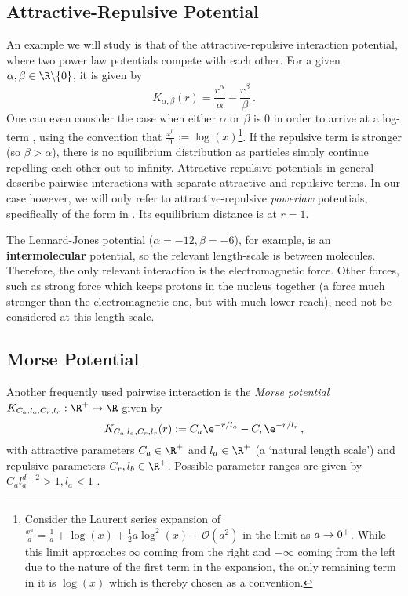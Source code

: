 \subsection{Attractive-Repulsive Potential}
An example we will study is that of the attractive-repulsive interaction potential, where two power law potentials compete with each other.
For a given $\alpha, \beta \in \R \backslash \{0\}$, it is given by
\begin{equation}
  K_{\alpha, \beta}(r) = \frac{r^\alpha}{\alpha} - \frac{r^\beta}{\beta}\,.
  \label{eq:attractive-repulsive-potential}
\end{equation}
One can even consider the case when either $\alpha$ or $\beta$ is 0 in order to arrive at a log-term \parencite{2017-explicit-solutions}, using the convention that $\frac{x^0}{0} := \log(x)$\footnote{
  Consider the Laurent series expansion of $\frac{x^a}{a} = \frac{1}{a} + \log(x) + \frac{1}{2}a \log^2(x) + \mathcal{O}(a^2)$ in the limit as $a \rightarrow 0^+$.
  While this limit approaches $\infty$ coming from the right and $-\infty$ coming from the left due to the nature of the first term in the expansion, the only remaining term in it is $\log(x)$ which is thereby chosen as a convention.
}.
If the repulsive term is stronger (so $\beta > \alpha$), there is no equilibrium distribution as particles simply continue repelling each other out to infinity.
Attractive-repulsive potentials in general describe pairwise interactions with separate attractive and repulsive terms.
In our case however, we will only refer to attractive-repulsive \textit{powerlaw} potentials, specifically of the form in .
Its equilibrium distance is at $r = 1$.

The Lennard-Jones potential ($\alpha=-12, \beta=-6$), for example, is an \textbf{intermolecular} potential, so the relevant length-scale is between molecules.
Therefore, the only relevant interaction is the electromagnetic force.
Other forces, such as strong force which keeps protons in the nucleus together (a force much stronger than the electromagnetic one, but with much lower reach), need not be considered at this length-scale.

\subsection{Morse Potential}
Another frequently used pairwise interaction is the \textit{Morse potential} $K_{C_a, l_a, C_r, l_r}: \R^+ \mapsto \R$ given by
\begin{equation}
  K_{C_a, l_a, C_r, l_r}(r) := C_a \e^{-r / l_a} - C_r \e^{-r / l_r}\,,
  \label{eq:morse-potential}
\end{equation}
with attractive parameters $C_a \in \R^+$ and $l_a \in \R^+$ (a `natural length scale') and repulsive parameters $C_r, l_b \in \R^+$.
Possible parameter ranges are given by $C_a l_a^{d-2} > 1, l_a < 1$ \parencite{2006-self-propelled,2014-explicit-flock-solutions-for-quasi-morse-potentials}.

